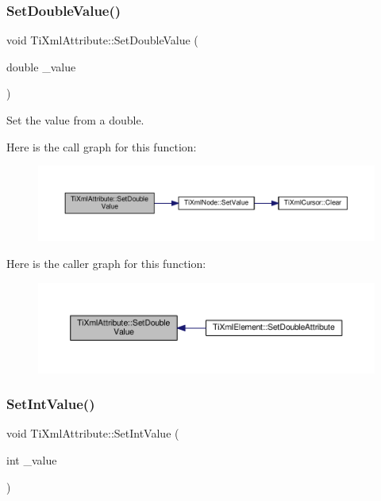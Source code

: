 \subsubsection{\texorpdfstring{Set\+Double\+Value()}{SetDoubleValue()}}
{\footnotesize\ttfamily void Ti\+Xml\+Attribute\+::\+Set\+Double\+Value (\begin{DoxyParamCaption}\item[{double}]{\+\_\+value }\end{DoxyParamCaption})}



Set the value from a double. 

Here is the call graph for this function\+:\nopagebreak
\begin{figure}[H]
\begin{center}
\leavevmode
\includegraphics[width=350pt]{class_ti_xml_attribute_a0316da31373496c4368ad549bf711394_cgraph}
\end{center}
\end{figure}
Here is the caller graph for this function\+:\nopagebreak
\begin{figure}[H]
\begin{center}
\leavevmode
\includegraphics[width=350pt]{class_ti_xml_attribute_a0316da31373496c4368ad549bf711394_icgraph}
\end{center}
\end{figure}
\mbox{\label{class_ti_xml_attribute_a7e065df640116a62ea4f4b7da5449cc8}} 
\subsubsection{\texorpdfstring{Set\+Int\+Value()}{SetIntValue()}}
{\footnotesize\ttfamily void Ti\+Xml\+Attribute\+::\+Set\+Int\+Value (\begin{DoxyParamCaption}\item[{int}]{\+\_\+value }\end{DoxyParamCaption})}



